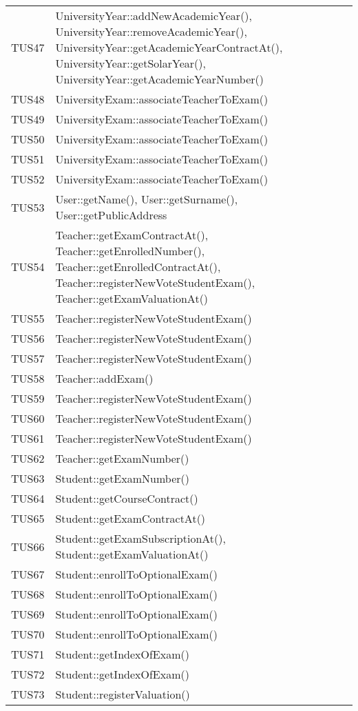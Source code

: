\documentclass[PianoDiQualifica.tex]{subfiles}
\begin{document}
\begin{longtable}[H]{P{5cm}P{9cm}}
	TUS47 & UniversityYear::addNewAcademicYear(), UniversityYear::removeAcademicYear(), UniversityYear::getAcademicYearContractAt(), UniversityYear::getSolarYear(), UniversityYear::getAcademicYearNumber()\\
	TUS48 & UniversityExam::associateTeacherToExam() \\
	TUS49 & UniversityExam::associateTeacherToExam() \\
	TUS50 & UniversityExam::associateTeacherToExam() \\
	TUS51 & UniversityExam::associateTeacherToExam() \\
	TUS52 & UniversityExam::associateTeacherToExam() \\
	TUS53 & User::getName(), User::getSurname(), User::getPublicAddress \\
	TUS54 & Teacher::getExamContractAt(), Teacher::getEnrolledNumber(), Teacher::getEnrolledContractAt(), Teacher::registerNewVoteStudentExam(), Teacher::getExamValuationAt()\\
	TUS55 & Teacher::registerNewVoteStudentExam()\\
	TUS56 & Teacher::registerNewVoteStudentExam()\\
	TUS57 & Teacher::registerNewVoteStudentExam()\\
	TUS58 & Teacher::addExam()\\
	TUS59 & Teacher::registerNewVoteStudentExam()\\
	TUS60 & Teacher::registerNewVoteStudentExam()\\
	TUS61 & Teacher::registerNewVoteStudentExam()\\
	TUS62 & Teacher::getExamNumber()\\
	TUS63 & Student::getExamNumber()\\
	TUS64 & Student::getCourseContract()\\
	TUS65 & Student::getExamContractAt()\\
	TUS66 & Student::getExamSubscriptionAt(), Student::getExamValuationAt()\\
	TUS67 & Student::enrollToOptionalExam()\\
	TUS68 & Student::enrollToOptionalExam()\\
	TUS69 & Student::enrollToOptionalExam()\\
	TUS70 & Student::enrollToOptionalExam()\\
	TUS71 & Student::getIndexOfExam()\\
	TUS72 & Student::getIndexOfExam()\\
	TUS73 & Student::registerValuation()\\

\end{longtable}
\end{document}
